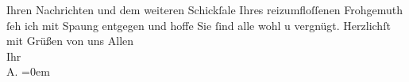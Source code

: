 \pstart
           Ihren Nachrichten und dem weiteren Schickſale Ihres reizumfloſſenen Frohgemuth ſeh ich mit Spa{\geminationn}ung entgegen und hoffe Sie ſind alle wohl u vergnügt.
               Herzlichſt mit Grüßen von uns Allen {\\[\baselineskip]}Ihr {\\[\baselineskip]}\spacefill\mbox{A.}\pend
           \leftskip=0em{}\endnumbering{}  
      